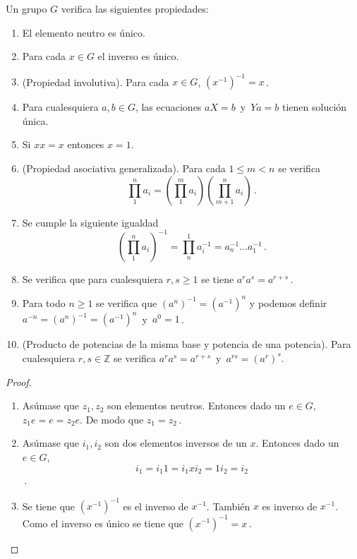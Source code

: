 \begin{nprop}
Un grupo $G$ verifica las siguientes propiedades:
\begin{enumerate}
  \item El elemento neutro es único.
  \item Para cada $x \in G$ el inverso es único.
  \item (Propiedad involutiva). Para cada $x \in G$, $(x^{-1})^{-1} = x$\,.
  \item Para cualesquiera $a,b \in G$, las ecuaciones $aX = b$\, y \,$Ya = b$ tienen solución única.
  \item Si $xx = x$ entonces $x=1$.
  \item (Propiedad asociativa generalizada). Para cada $1 \leq m < n$ se verifica \begin{equation*}
    \prod_{1}^{n} a_i = \left(\prod_{1}^{m} a_i\right)\left(\prod_{m+1}^{n} a_i\right)\,.
  \end{equation*}
  \item Se cumple la siguiente igualdad \begin{equation*}
    \left(\prod_{1}^n a_i\right)^{-1} = \prod_{n}^{1} a_i^{-1} = a_n^{-1}\dots a_1^{-1}\,.
  \end{equation*}
  \item Se verifica que para cualesquiera $r,s \ge 1$ se tiene $a^ra^s= a^{r+s}$\,.
  \item Para todo $n \ge 1$ se verifica que $\left(a^n\right)^{-1} = \left(a^{-1}\right)^n$ y podemos definir $a^{-n} = \left(a^n\right)^{-1} = \left(a^{-1}\right)^n$\, y \,$a^0 = 1$\,.
  \item (Producto de potencias de la misma base y potencia de una potencia). Para cualesquiera $r,s \in \mathbb{Z}$ se verifica $a^ra^s = a^{r+s}$\, y\, $a^{rs} = \left(a^r\right)^s$.
\end{enumerate}

\end{nprop}
\begin{proof}\hfill
\begin{enumerate}
  \item Asúmase que $z_1,z_2$ son elementos neutros. Entonces dado un $e \in G$, $z_1e = e = z_2e$. De modo que $z_1 = z_2$\,.
  \item Asúmase que $i_1,i_2$ son dos elementos inversos de un $x$. Entonces dado un $e \in G$,
    $$i_1 = i_1  1 = i_1  x  i_2 = 1  i_2 = i_2$$\,.
  \item Se tiene que $(x^{-1})^{-1}$ es el inverso de $x^{-1}$. También $x$ es inverso de $x^{-1}$. Como el inverso es único se tiene que $(x^{-1})^{-1} = x$\,.
\end{enumerate}
\end{proof}

